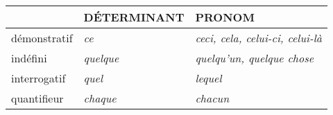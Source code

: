 \documentclass[UTF8]{report}
\begin{document}
\begin{table}[H]
\centering
\begin{tabular}{|l|l|l|}
\hline
\rowcolor{cyan!20}
\textbf{} & \textbf{DÉTERMINANT} & \textbf{PRONOM} \\ \hline
démonstratif & \textit{ce} & \textit{ceci, cela, celui-ci, celui-là} \\ \hline
indéfini & \textit{quelque} & \textit{quelqu’un, quelque chose} \\ \hline
interrogatif & \textit{quel} & \textit{lequel} \\ \hline
quantifieur & \textit{chaque} & \textit{chacun} \\ \hline
\end{tabular}

\end{table}
\end{document}
